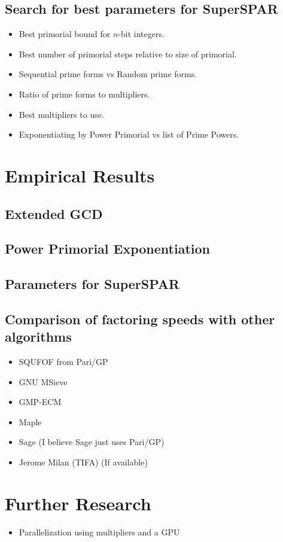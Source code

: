 \documentclass[11pt, letterpaper]{article}
\theoremstyle{definition}
\begin{document}
\subsection{Search for best parameters for SuperSPAR}
\begin{itemize}
\item Best primorial bound for $n$-bit integers.
\item Best number of primorial steps relative to size of primorial.
\item Sequential prime forms vs Random prime forms.
\item Ratio of prime forms to multipliers.
\item Best multipliers to use.
\item Exponentiating by Power Primorial vs list of Prime Powers.
\end{itemize}



\bigbreak
\section{Empirical Results}

\subsection{Extended GCD}
\subsection{Power Primorial Exponentiation}
\subsection{Parameters for SuperSPAR}

\subsection{Comparison of factoring speeds with other algorithms}
\begin{itemize}
\item SQUFOF from Pari/GP
\item GNU MSieve
\item GMP-ECM
\item Maple
\item Sage (I believe Sage just uses Pari/GP)
\item Jerome Milan (TIFA) (If available)
\end{itemize}


\bigbreak
\section{Further Research}
\begin{itemize}
\item Parallelization using multipliers and a GPU
\end{itemize}
\end{document}
